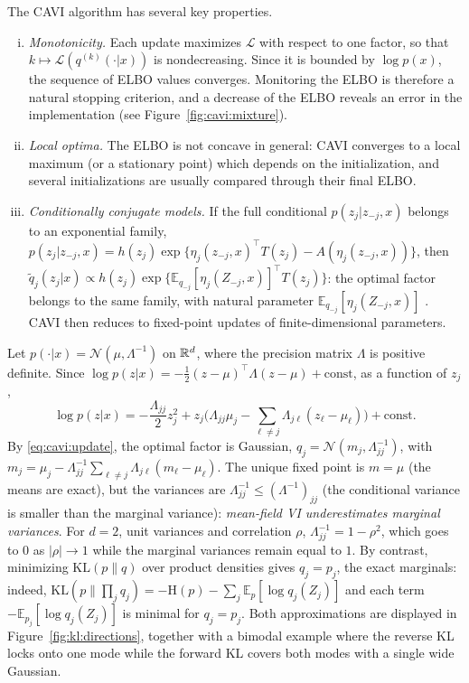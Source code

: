 \documentclass[english,graybox,envcountchap,envcountsame,sectrefs,shortlabels]{svmono}
\theoremstyle{style}
\newcommand{\gauss}{\mathcal{N}}
\newcommand{\eqsp}{}
\begin{document}
The CAVI algorithm has several key properties.
\begin{enumerate}[i)]
\item \emph{Monotonicity.} Each update maximizes $\mathcal{L}$ with respect to one factor, so that $k\mapsto\mathcal{L}(q^{(k)}(\cdot|x))$ is nondecreasing. Since it is bounded by $\log p(x)$, the sequence of ELBO values converges. Monitoring the ELBO is therefore a natural stopping criterion, and a decrease of the ELBO reveals an error in the implementation (see Figure~\ref{fig:cavi:mixture}).
\item \emph{Local optima.} The ELBO is not concave in general: CAVI converges to a local maximum (or a stationary point) which depends on the initialization, and several initializations are usually compared through their final ELBO.
\item \emph{Conditionally conjugate models.} If the full conditional $p(z_j|z_{-j},x)$ belongs to an exponential family, $p(z_j|z_{-j},x) = h(z_j)\exp\{\eta_j(z_{-j},x)^\top T(z_j) - A(\eta_j(z_{-j},x))\}$, then $\tilde q_j(z_j|x)\propto h(z_j)\exp\{\mathbb{E}_{q_{-j}}[\eta_j(Z_{-j},x)]^\top T(z_j)\}$: the optimal factor belongs to the same family, with natural parameter $\mathbb{E}_{q_{-j}}[\eta_j(Z_{-j},x)]$ \cite{blei2017variational}. CAVI then reduces to fixed-point updates of finite-dimensional parameters.
\end{enumerate}

\begin{example}
\label{ex:mf:gauss}
Let $p(\cdot|x) = \gauss(\mu,\Lambda^{-1})$ on $\mathbb{R}^d$, where the precision matrix $\Lambda$ is positive definite. Since $\log p(z|x) = -\frac12(z-\mu)^\top\Lambda(z-\mu) + \mathrm{const}$, as a function of $z_j$,
$$
\log p(z|x) = -\frac{\Lambda_{jj}}{2}z_j^2 + z_j\Big(\Lambda_{jj}\mu_j - \sum_{\ell\neq j}\Lambda_{j\ell}(z_\ell-\mu_\ell)\Big) + \mathrm{const}\eqsp.
$$
By \eqref{eq:cavi:update}, the optimal factor is Gaussian, $q_j = \gauss(m_j,\Lambda_{jj}^{-1})$, with $m_j = \mu_j - \Lambda_{jj}^{-1}\sum_{\ell\neq j}\Lambda_{j\ell}(m_\ell-\mu_\ell)$. The unique fixed point is $m=\mu$ (the means are exact), but the variances are $\Lambda_{jj}^{-1}\leq (\Lambda^{-1})_{jj}$ (the conditional variance is smaller than the marginal variance): \emph{mean-field VI underestimates marginal variances}. For $d=2$, unit variances and correlation $\rho$, $\Lambda_{jj}^{-1} = 1-\rho^2$, which goes to $0$ as $|\rho|\to1$ while the marginal variances remain equal to $1$. By contrast, minimizing $\mathrm{KL}(p\|q)$ over product densities gives $q_j = p_j$, the exact marginals: indeed, $\mathrm{KL}(p\|\prod_j q_j) = -\mathrm{H}(p) - \sum_j\mathbb{E}_p[\log q_j(Z_j)]$ and each term $-\mathbb{E}_{p_j}[\log q_j(Z_j)]$ is minimal for $q_j = p_j$. Both approximations are displayed in Figure~\ref{fig:kl:directions}, together with a bimodal example where the reverse KL locks onto one mode while the forward KL covers both modes with a single wide Gaussian.
\end{example}
\end{document}

